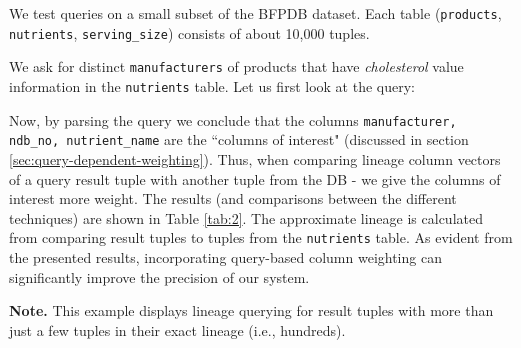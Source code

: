 \begin{runexample}
We test queries on a small subset of the BFPDB dataset. Each table (\texttt{products}, \texttt{nutrients}, \texttt{serving\_size}) consists of about 10,000 tuples.
\end{runexample}

\begin{example-withrun}\label{experiment:2}
% 
We ask for distinct \texttt{manufacturers} of products that have \textit{cholesterol} value information in the \texttt{nutrients} table. Let us first look at the query:


Now, by parsing the query we conclude that the columns \texttt{manufacturer, ndb\_no, nutrient\_name} are the ``columns of interest" (discussed in section \ref{sec:query-dependent-weighting}). Thus, when comparing lineage column vectors of a query result tuple with another tuple from the DB - we give the columns of interest more weight. The results (and comparisons between the different techniques) are shown in Table \ref{tab:2}. The approximate lineage is calculated from comparing result tuples to tuples from the \texttt{nutrients} table. As evident from the presented results, incorporating query-based column weighting can significantly improve the precision of our system. 
\par\textbf{Note.} This example displays lineage querying for result tuples with more than just a few tuples in their exact lineage (i.e., hundreds).

\end{example-withrun}

